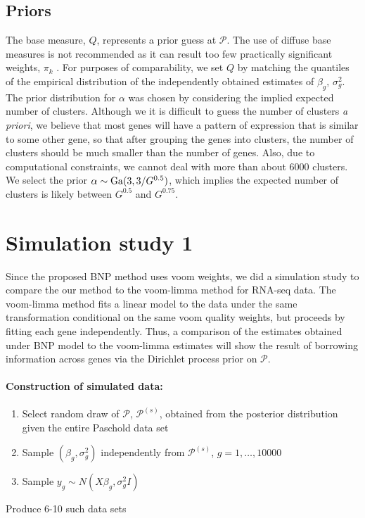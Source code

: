 \subsection{Priors}
The base measure, $Q$, represents a prior guess at $\mathcal{P}$. The use of diffuse base measures is not recommended as it can result too few practically significant weights, $\pi_k$ \citep[p.554]{gelman-book}. For purposes of comparability, we set $Q$ by matching the quantiles of the empirical distribution of the independently obtained estimates of $\beta_g$, $\sigma_g^2$. The prior distribution for $\alpha$ was chosen by considering the implied expected number of clusters. Although we it is difficult to guess the number of clusters \textit{a priori}, we believe that most genes will have a pattern of expression that is similar to some other gene, so that after grouping the genes into clusters, the number of clusters should be much smaller than the number of genes. Also, due to computational constraints, we cannot deal with more than about 6000 clusters. We select the prior $\alpha \sim \operatorname{Ga}(3,3/G^{0.5})$, which implies the expected number of clusters is likely between $G^{0.5}$ and $G^{0.75}$.

\section{Simulation study 1}
Since the proposed BNP method uses voom weights, we did a simulation study to compare the our method to the voom-limma method for RNA-seq data. The voom-limma method fits a linear model to the data under the same transformation conditional on the same voom quality weights, but proceeds by fitting each gene independently. Thus, a comparison of the estimates obtained under BNP model to the voom-limma estimates will show the result of borrowing information across genes via the Dirichlet process prior on $\mathcal{P}$.

\paragraph{Construction of simulated data:}
\begin{enumerate}
\item Select random draw of $\mathcal{P}$, $\mathcal{P}^{(s)}$, obtained from the posterior distribution given the entire Paschold data set

\item Sample $(\beta_g,\sigma^2_g)$ independently from $\mathcal{P}^{(s)}$, $g=1,\ldots,10000$ 

\item Sample $y_{g} \sim N(X\beta_g,\sigma^2_g I)$
\end{enumerate}
Produce 6-10 such data sets\\

